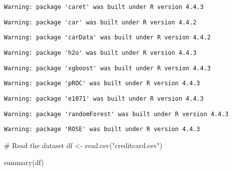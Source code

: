 \documentclass[
  11pt,
  letterpaper,
  DIV=11,
  numbers=noendperiod]{scrartcl}
\newenvironment{Shaded}{}{}
\newcommand{\CommentTok}[1]{\textcolor[rgb]{0.42,0.45,0.49}{#1}}
\newcommand{\FunctionTok}[1]{\textcolor[rgb]{0.44,0.26,0.76}{#1}}
\newcommand{\NormalTok}[1]{\textcolor[rgb]{0.14,0.16,0.18}{#1}}
\newcommand{\OtherTok}[1]{\textcolor[rgb]{0.44,0.26,0.76}{#1}}
\newcommand{\StringTok}[1]{\textcolor[rgb]{0.01,0.18,0.38}{#1}}
\begin{document}
\begin{verbatim}
Warning: package 'caret' was built under R version 4.4.3
\end{verbatim}

\begin{verbatim}
Warning: package 'car' was built under R version 4.4.2
\end{verbatim}

\begin{verbatim}
Warning: package 'carData' was built under R version 4.4.2
\end{verbatim}

\begin{verbatim}
Warning: package 'h2o' was built under R version 4.4.3
\end{verbatim}

\begin{verbatim}
Warning: package 'xgboost' was built under R version 4.4.3
\end{verbatim}

\begin{verbatim}
Warning: package 'pROC' was built under R version 4.4.3
\end{verbatim}

\begin{verbatim}
Warning: package 'e1071' was built under R version 4.4.3
\end{verbatim}

\begin{verbatim}
Warning: package 'randomForest' was built under R version 4.4.3
\end{verbatim}

\begin{verbatim}
Warning: package 'ROSE' was built under R version 4.4.3
\end{verbatim}

\begin{Shaded}
\begin{Highlighting}[]
\CommentTok{\# Read the dataset}
\NormalTok{df }\OtherTok{\textless{}{-}} \FunctionTok{read.csv}\NormalTok{(}\StringTok{"creditcard.csv"}\NormalTok{)}

\FunctionTok{summary}\NormalTok{(df)}
\end{Highlighting}
\end{Shaded}
\end{document}
